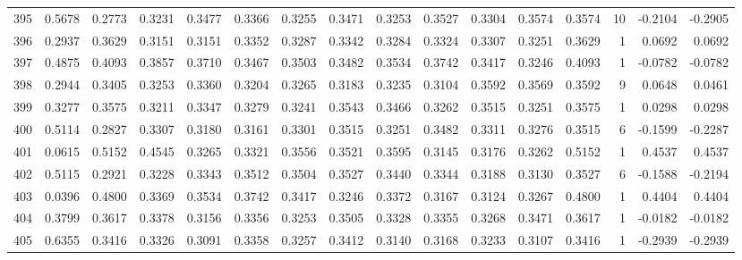 \begin{tabular}{lrrrrrrrrrrrrrrr}
395 &      0.5678 &  0.2773 &  0.3231 &  0.3477 &  0.3366 &  0.3255 &  0.3471 &  0.3253 &  0.3527 &  0.3304 &   0.3574 &     0.3574 &     10 &                   -0.2104 &                    -0.2905 \\
396 &      0.2937 &  0.3629 &  0.3151 &  0.3151 &  0.3352 &  0.3287 &  0.3342 &  0.3284 &  0.3324 &  0.3307 &   0.3251 &     0.3629 &      1 &                    0.0692 &                     0.0692 \\
397 &      0.4875 &  0.4093 &  0.3857 &  0.3710 &  0.3467 &  0.3503 &  0.3482 &  0.3534 &  0.3742 &  0.3417 &   0.3246 &     0.4093 &      1 &                   -0.0782 &                    -0.0782 \\
398 &      0.2944 &  0.3405 &  0.3253 &  0.3360 &  0.3204 &  0.3265 &  0.3183 &  0.3235 &  0.3104 &  0.3592 &   0.3569 &     0.3592 &      9 &                    0.0648 &                     0.0461 \\
399 &      0.3277 &  0.3575 &  0.3211 &  0.3347 &  0.3279 &  0.3241 &  0.3543 &  0.3466 &  0.3262 &  0.3515 &   0.3251 &     0.3575 &      1 &                    0.0298 &                     0.0298 \\
400 &      0.5114 &  0.2827 &  0.3307 &  0.3180 &  0.3161 &  0.3301 &  0.3515 &  0.3251 &  0.3482 &  0.3311 &   0.3276 &     0.3515 &      6 &                   -0.1599 &                    -0.2287 \\
401 &      0.0615 &  0.5152 &  0.4545 &  0.3265 &  0.3321 &  0.3556 &  0.3521 &  0.3595 &  0.3145 &  0.3176 &   0.3262 &     0.5152 &      1 &                    0.4537 &                     0.4537 \\
402 &      0.5115 &  0.2921 &  0.3228 &  0.3343 &  0.3512 &  0.3504 &  0.3527 &  0.3440 &  0.3344 &  0.3188 &   0.3130 &     0.3527 &      6 &                   -0.1588 &                    -0.2194 \\
403 &      0.0396 &  0.4800 &  0.3369 &  0.3534 &  0.3742 &  0.3417 &  0.3246 &  0.3372 &  0.3167 &  0.3124 &   0.3267 &     0.4800 &      1 &                    0.4404 &                     0.4404 \\
404 &      0.3799 &  0.3617 &  0.3378 &  0.3156 &  0.3356 &  0.3253 &  0.3505 &  0.3328 &  0.3355 &  0.3268 &   0.3471 &     0.3617 &      1 &                   -0.0182 &                    -0.0182 \\
405 &      0.6355 &  0.3416 &  0.3326 &  0.3091 &  0.3358 &  0.3257 &  0.3412 &  0.3140 &  0.3168 &  0.3233 &   0.3107 &     0.3416 &      1 &                   -0.2939 &                    -0.2939 \\

\end{tabular}

